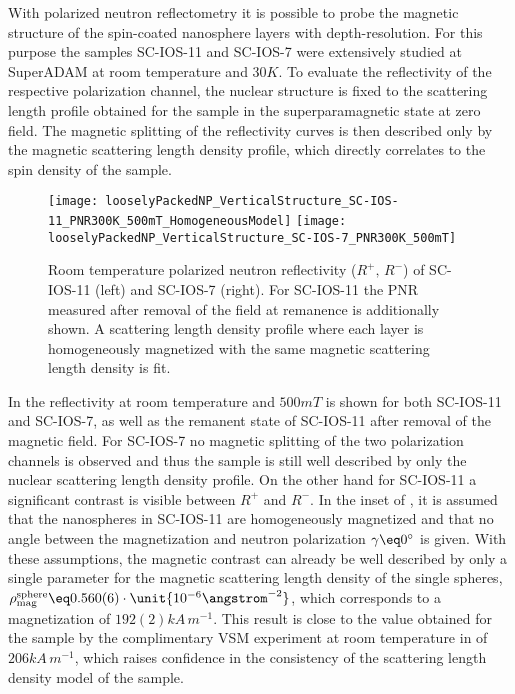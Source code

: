 \documentclass[\main/dresen_thesis.tex]{subfiles}
\begin{document}
  \label{sec:looselyPackedNS:layers:pnr}
  With polarized neutron reflectometry it is possible to probe the magnetic structure of the spin-coated nanosphere layers with depth-resolution.
  For this purpose the samples SC-IOS-11 and SC-IOS-7 were extensively studied at SuperADAM at room temperature and $30 \unit{K}$.
  To evaluate the reflectivity of the respective polarization channel, the nuclear structure is fixed to the scattering length profile obtained for the sample in the superparamagnetic state at zero field.
  The magnetic splitting of the reflectivity curves is then described only by the magnetic scattering length density profile, which directly correlates to the spin density of the sample.

  \begin{figure}[tb]
    \centering
    \texttt{[image: looselyPackedNP\_VerticalStructure\_SC-IOS-11\_PNR300K\_500mT\_HomogeneousModel]}
    \texttt{[image: looselyPackedNP\_VerticalStructure\_SC-IOS-7\_PNR300K\_500mT]}
    \caption{\label{fig:looselyPackedNP:layer:pnrRoomTemperatureMagneticHomModel}Room temperature polarized neutron reflectivity ($R^{+},\, R^{-}$) of SC-IOS-11 (left) and SC-IOS-7 (right). For SC-IOS-11 the PNR measured after removal of the field at remanence is additionally shown. A scattering length density profile where each layer is homogeneously magnetized with the same magnetic scattering length density is fit.}
  \end{figure}
  In  the reflectivity at room temperature and $500 \unit{mT}$ is shown for both SC-IOS-11 and SC-IOS-7, as well as the remanent state of SC-IOS-11 after removal of the magnetic field.
  For SC-IOS-7 no magnetic splitting of the two polarization channels is observed and thus the sample is still well described by only the nuclear scattering length density profile.
  On the other hand for SC-IOS-11 a significant contrast is visible between $R^{+}$ and $R^{-}$.
  In the inset of , it is assumed that the nanospheres in SC-IOS-11 are homogeneously magnetized and that no angle between the magnetization and neutron polarization $\gamma \eq 0 ^\circ$ is given.
  With these assumptions, the magnetic contrast can already be well described by only a single parameter for the magnetic scattering length density of the single spheres, $\rho_\mathrm{mag}^\mathrm{sphere} \eq 0.560(6) \cdot \unit{10^{-6} \angstrom^{-2}}$, which corresponds to a magnetization of $192(2) \unit{kA \, m^{-1}}$.
  This result is close to the value obtained for the sample by the complimentary VSM experiment at room temperature in  of $206 \unit{kA \,m^{-1}}$, which raises confidence in the consistency of the scattering length density model of the sample.
\end{document}
